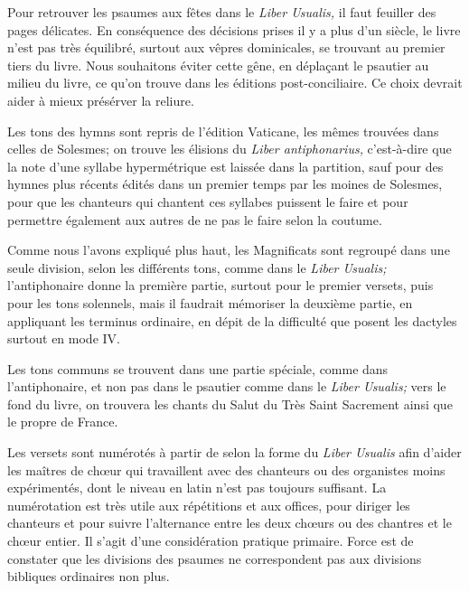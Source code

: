 \begin{frpars}
Pour retrouver les psaumes aux fêtes dans le \textit{Liber Usualis,} il faut feuiller des pages délicates. En conséquence des décisions prises il y a plus d'un siècle, le livre n'est pas très équilibré, surtout aux vêpres dominicales, se trouvant au premier tiers du livre. Nous souhaitons éviter cette gêne, en déplaçant le psautier au milieu du livre, ce qu'on trouve dans les éditions post-conciliaire. Ce choix devrait aider à mieux présérver la reliure.

Les tons des hymns sont repris de l'édition Vaticane, les mêmes trouvées dans celles de Solesmes; on trouve les élisions du  \textit{Liber antiphonarius,} c’est-à-dire que la note d'une syllabe hypermétrique est laissée dans la partition, sauf pour des hymnes plus récents édités dans un premier temps par les moines de Solesmes, pour que les chanteurs qui chantent ces syllabes puissent le faire et pour permettre également aux autres de ne pas le faire selon la coutume. 

Comme nous l'avons expliqué plus haut, les Magnificats sont regroupé dans une seule division, selon les différents tons, comme dans le \textit{Liber Usualis;} l'antiphonaire donne la première partie, surtout pour le premier versets, puis pour les tons solennels, mais il faudrait mémoriser la deuxième partie, en appliquant les terminus ordinaire, en dépit de la difficulté que posent les dactyles surtout en mode IV.

Les tons communs se trouvent dans une partie spéciale, comme dans l'antiphonaire, et non pas dans le psautier comme dans  le \textit{Liber Usualis;} vers le fond du livre, on trouvera les chants du Salut du Très Saint Sacrement ainsi que le propre de France.

Les versets sont numérotés à partir de  selon la forme du \textit{Liber Usualis} afin d'aider les maîtres de chœur qui travaillent avec des chanteurs ou des organistes moins expérimentés, dont le niveau en latin n'est pas toujours suffisant. La numérotation est très utile aux répétitions et aux offices, pour diriger les chanteurs et pour suivre l'alternance entre les deux chœurs ou des chantres et le chœur entier. Il s'agit d'une considération pratique primaire. Force est de constater que les divisions des psaumes ne correspondent pas aux divisions bibliques ordinaires non plus.
\end{frpars}